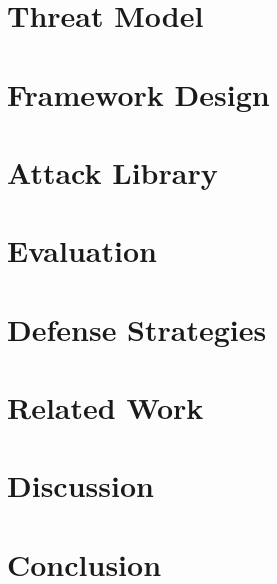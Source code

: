 \documentclass[10pt,letterpaper,twocolumn]{article}
\begin{document}
\section{Threat Model}


\section{Framework Design}


\section{Attack Library}


\section{Evaluation}


\section{Defense Strategies}


\section{Related Work}


\section{Discussion}


\section{Conclusion}


\printbibliography
\end{document}
